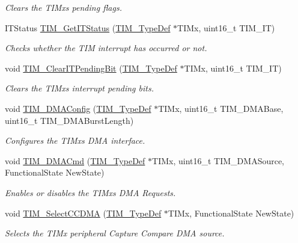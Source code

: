 \begin{DoxyCompactItemize}
\begin{DoxyCompactList}\small\item\em Clears the T\+I\+Mx\textquotesingle{}s pending flags. \end{DoxyCompactList}\item 
I\+T\+Status \hyperlink{group___t_i_m___group5_ga0827a0b411707304f76d33050727c24d}{T\+I\+M\+\_\+\+Get\+I\+T\+Status} (\hyperlink{struct_t_i_m___type_def}{T\+I\+M\+\_\+\+Type\+Def} $\ast$T\+I\+Mx, uint16\+\_\+t T\+I\+M\+\_\+\+IT)
\begin{DoxyCompactList}\small\item\em Checks whether the T\+IM interrupt has occurred or not. \end{DoxyCompactList}\item 
void \hyperlink{group___t_i_m___group5_ga9eb1e95af71ed380f51a2c6d585cc5d6}{T\+I\+M\+\_\+\+Clear\+I\+T\+Pending\+Bit} (\hyperlink{struct_t_i_m___type_def}{T\+I\+M\+\_\+\+Type\+Def} $\ast$T\+I\+Mx, uint16\+\_\+t T\+I\+M\+\_\+\+IT)
\begin{DoxyCompactList}\small\item\em Clears the T\+I\+Mx\textquotesingle{}s interrupt pending bits. \end{DoxyCompactList}\item 
void \hyperlink{group___t_i_m___group5_gad7156f84c436c8ac92cd789611826d09}{T\+I\+M\+\_\+\+D\+M\+A\+Config} (\hyperlink{struct_t_i_m___type_def}{T\+I\+M\+\_\+\+Type\+Def} $\ast$T\+I\+Mx, uint16\+\_\+t T\+I\+M\+\_\+\+D\+M\+A\+Base, uint16\+\_\+t T\+I\+M\+\_\+\+D\+M\+A\+Burst\+Length)
\begin{DoxyCompactList}\small\item\em Configures the T\+I\+Mx\textquotesingle{}s D\+MA interface. \end{DoxyCompactList}\item 
void \hyperlink{group___t_i_m___group5_ga24700389cfa3ea9b42234933b23f1399}{T\+I\+M\+\_\+\+D\+M\+A\+Cmd} (\hyperlink{struct_t_i_m___type_def}{T\+I\+M\+\_\+\+Type\+Def} $\ast$T\+I\+Mx, uint16\+\_\+t T\+I\+M\+\_\+\+D\+M\+A\+Source, Functional\+State New\+State)
\begin{DoxyCompactList}\small\item\em Enables or disables the T\+I\+Mx\textquotesingle{}s D\+MA Requests. \end{DoxyCompactList}\item 
void \hyperlink{group___t_i_m___group5_ga5273cb65acb885fe7982827b1c6b7d75}{T\+I\+M\+\_\+\+Select\+C\+C\+D\+MA} (\hyperlink{struct_t_i_m___type_def}{T\+I\+M\+\_\+\+Type\+Def} $\ast$T\+I\+Mx, Functional\+State New\+State)
\begin{DoxyCompactList}\small\item\em Selects the T\+I\+Mx peripheral Capture Compare D\+MA source. \end{DoxyCompactList}\end{DoxyCompactItemize}


